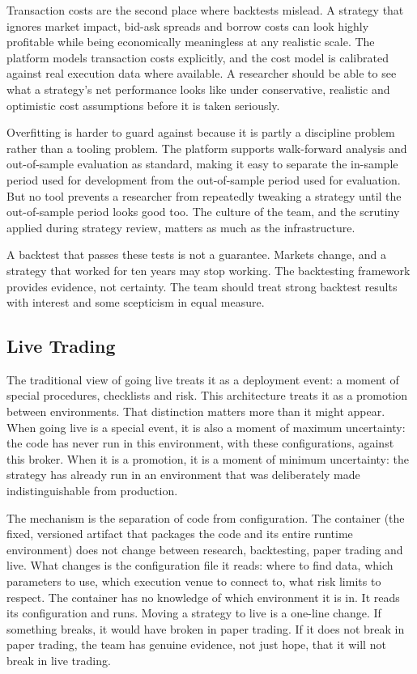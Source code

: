 \documentclass[
  11pt,
]{article}
\begin{document}
Transaction costs are the second place where backtests mislead. A
strategy that ignores market impact, bid-ask spreads and borrow costs
can look highly profitable while being economically meaningless at any
realistic scale. The platform models transaction costs explicitly, and
the cost model is calibrated against real execution data where
available. A researcher should be able to see what a strategy's net
performance looks like under conservative, realistic and optimistic cost
assumptions before it is taken seriously.

Overfitting is harder to guard against because it is partly a discipline
problem rather than a tooling problem. The platform supports
walk-forward analysis and out-of-sample evaluation as standard, making
it easy to separate the in-sample period used for development from the
out-of-sample period used for evaluation. But no tool prevents a
researcher from repeatedly tweaking a strategy until the out-of-sample
period looks good too. The culture of the team, and the scrutiny applied
during strategy review, matters as much as the infrastructure.

A backtest that passes these tests is not a guarantee. Markets change,
and a strategy that worked for ten years may stop working. The
backtesting framework provides evidence, not certainty. The team should
treat strong backtest results with interest and some scepticism in equal
measure.

\subsection{Live Trading}\label{live-trading}

The traditional view of going live treats it as a deployment event: a
moment of special procedures, checklists and risk. This architecture
treats it as a promotion between environments. That distinction matters
more than it might appear. When going live is a special event, it is
also a moment of maximum uncertainty: the code has never run in this
environment, with these configurations, against this broker. When it is
a promotion, it is a moment of minimum uncertainty: the strategy has
already run in an environment that was deliberately made
indistinguishable from production.

The mechanism is the separation of code from configuration. The
container (the fixed, versioned artifact that packages the code and
its entire runtime environment) does not change between research,
backtesting, paper trading and live. What changes is the configuration
file it reads: where to find data, which parameters to use, which
execution venue to connect to, what risk limits to respect. The
container has no knowledge of which environment it is in. It reads its
configuration and runs. Moving a strategy to live is a one-line change.
If something breaks, it would have broken in paper trading. If it does
not break in paper trading, the team has genuine evidence, not just
hope, that it will not break in live trading.
\end{document}
